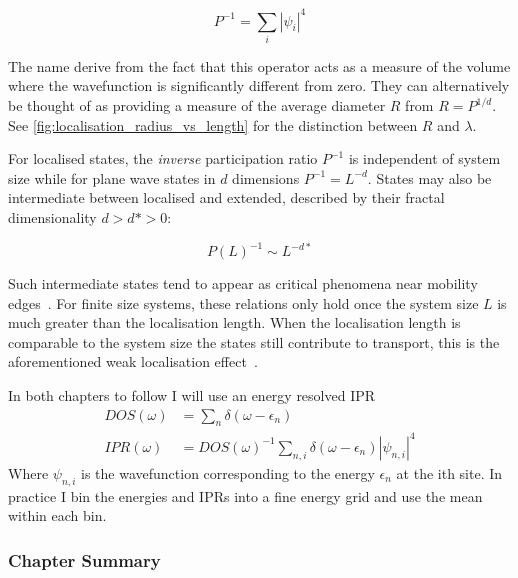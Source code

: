 \[
P^{-1} = \sum_i |\psi_i|^4
\]

The name derive from the fact that this operator acts as a measure of the volume where the wavefunction is significantly different from zero. They can alternatively be thought of as providing a measure of the average diameter \(R\) from \(R = P^{1/d}\). See \cref{fig:localisation_radius_vs_length} for the distinction between \(R\) and \(\lambda\).

For localised states, the \emph{inverse} participation ratio \(P^{-1}\) is independent of system size while for plane wave states in \(d\) dimensions \(P^{-1} = L^{-d}\). States may also be intermediate between localised and extended, described by their fractal dimensionality \(d > d* > 0\):

\[
P(L)^{-1} \sim L^{-d*} 
\]

Such intermediate states tend to appear as critical phenomena near mobility edges~\autocite{eversAndersonTransitions2008}. For finite size systems, these relations only hold once the system size \(L\) is much greater than the localisation length. When the localisation length is comparable to the system size the states still contribute to transport, this is the aforementioned weak localisation effect~\autocite{altshulerMagnetoresistanceHallEffect1980,dattaElectronicTransportMesoscopic1995}.

In both chapters to follow I will use an energy resolved IPR \[
\begin{aligned}
DOS(\omega) &= \sum_n \delta(\omega - \epsilon_n)\\
IPR(\omega) &= DOS(\omega)^{-1} \sum_{n,i} \delta(\omega - \epsilon_n) |\psi_{n,i}|^4
\end{aligned}
\] Where \(\psi_{n,i}\) is the wavefunction corresponding to the energy \(\epsilon_n\) at the ith site. In practice I bin the energies and IPRs into a fine energy grid and use the mean within each bin.

\hypertarget{chapter-summary}{%
\subsubsection{Chapter Summary}\label{chapter-summary}}

